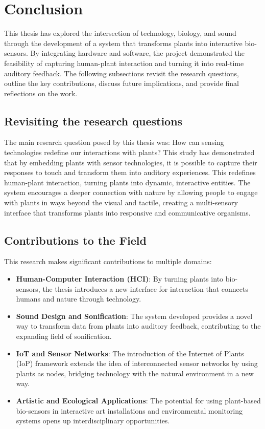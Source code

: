 \section{Conclusion}

This thesis has explored the intersection of technology, biology, and sound through the development of a system that transforms plants into interactive bio-sensors. By integrating hardware and software, the project demonstrated the feasibility of capturing human-plant interaction and turning it into real-time auditory feedback. The following subsections revisit the research questions, outline the key contributions, discuss future implications, and provide final reflections on the work.

\subsection{Revisiting the research questions}

The main research question posed by this thesis was: How can sensing technologies redefine our interactions with plants? This study has demonstrated that by embedding plants with sensor technologies, it is possible to capture their responses to touch and transform them into auditory experiences. This redefines human-plant interaction, turning plants into dynamic, interactive entities. The system encourages a deeper connection with nature by allowing people to engage with plants in ways beyond the visual and tactile, creating a multi-sensory interface that transforms plants into responsive and communicative organisms.

\subsection{Contributions to the Field}

This research makes significant contributions to multiple domains:
\begin{itemize}
    \item \textbf{Human-Computer Interaction (HCI)}: By turning plants into bio-sensors, the thesis introduces a new interface for interaction that connects humans and nature through technology.
    \item \textbf{Sound Design and Sonification}: The system developed provides a novel way to transform data from plants into auditory feedback, contributing to the expanding field of sonification.
    \item \textbf{IoT and Sensor Networks}: The introduction of the Internet of Plants (IoP) framework extends the idea of interconnected sensor networks by using plants as nodes, bridging technology with the natural environment in a new way.
    \item \textbf{Artistic and Ecological Applications}: The potential for using plant-based bio-sensors in interactive art installations and environmental monitoring systems opens up interdisciplinary opportunities.
\end{itemize}
  

